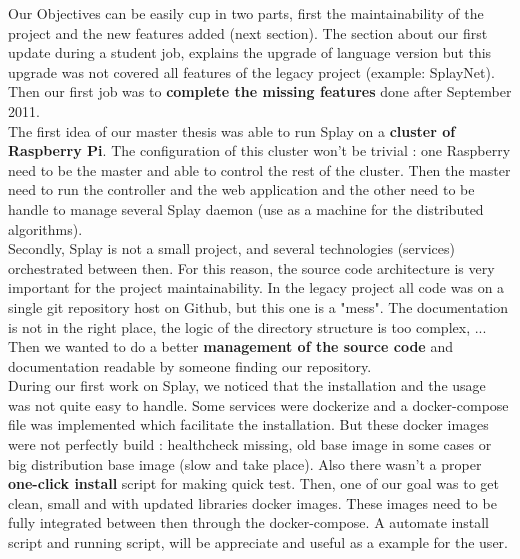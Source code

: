 \documentclass{eplmastersthesis}
\begin{document}
      Our Objectives can be easily cup in two parts, first the maintainability
      of the project and the new features added (next section). The section
      about our first update during a student job, explains the upgrade of
      language version but this upgrade was not covered all features of the
      legacy project (example: SplayNet). Then our first job was to
      \textbf{complete the missing features} done after  September 2011.\\

      The first idea of our master thesis was able to run Splay on a
      \textbf{cluster of Raspberry Pi}. The configuration of this cluster won't
      be trivial : one Raspberry need to be the master and able to control the
      rest of the cluster. Then the master need to run the controller and the
      web application and the other need to be handle to manage several Splay
      daemon (use as a machine for the distributed algorithms). \\

      Secondly, Splay is not a small project, and several technologies
      (services) orchestrated between then. For this reason, the source code
      architecture is very important for the project maintainability. In the
      legacy project all code was on a single git repository host on Github,
      but this one is a "mess". The documentation is not in the right place,
      the logic of the directory structure is too complex, ... Then we wanted
      to do a better \textbf{management of the source code} and documentation
      readable by someone finding our repository. \\

      During our first work on Splay, we noticed that the installation and the
      usage was not quite easy to handle. Some services were dockerize and a
      docker-compose file was implemented which facilitate the installation.
      But these docker images were not perfectly build : healthcheck missing,
      old base image in some cases or big distribution base image (slow and
      take place). Also there wasn't a proper \textbf{one-click install}
      script for making quick test. Then, one of our goal was to get clean,
      small and with updated libraries docker images. These images need to be
      fully integrated between then through the docker-compose. A automate
      install script and running script, will be appreciate and useful as a
      example for the user.\\
\end{document}
